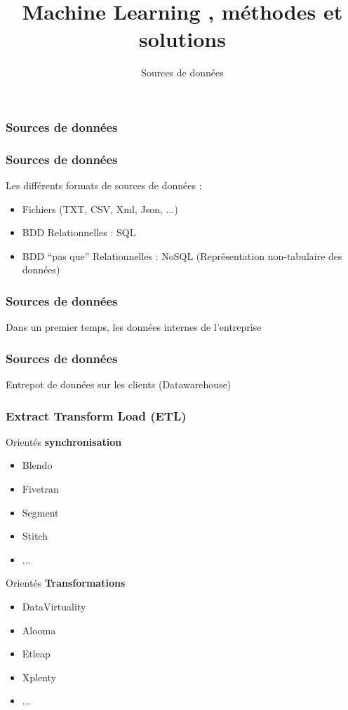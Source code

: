 \documentclass{formation}
\title{Machine Learning , méthodes et solutions}
\subtitle{Sources de données}
\begin{document}
\maketitle

\begin{frame}
  \frametitle{Sources de données}
\end{frame}

\begin{frame}
  \frametitle{Sources de données}
  Les différents formats de sources de  données :
  \begin{itemize}
  \item Fichiers (TXT, CSV, Xml, Json, ...)
  \item BDD Relationnelles : SQL
  \item BDD ``pas que'' Relationnelles : NoSQL (Représentation non-tabulaire des données)
  \end{itemize}
\end{frame}

\begin{frame}
  \frametitle{Sources de données}
  Dans un premier temps, les données internes de l'entreprise
\end{frame}

\begin{frame}
  \frametitle{Sources de données}
  Entrepot de données sur les clients (Datawarehouse)
\end{frame}

\begin{frame}
  \frametitle{Extract Transform Load (ETL)}
  \begin{minipage}[l]{0.49\linewidth}
    Orientés \textbf{synchronisation}
    \begin{itemize}
    \item Blendo
    \item Fivetran
    \item Segment
    \item Stitch
    \item ...
    \end{itemize}
  \end{minipage}\hfill
  \begin{minipage}[l]{0.49\linewidth}
    Orientés \textbf{Transformations}
    \begin{itemize}
    \item DataVirtuality
    \item Alooma
    \item Etleap
    \item Xplenty
    \item ...
    \end{itemize}
  \end{minipage}\hfill
\end{frame}
\end{document}
